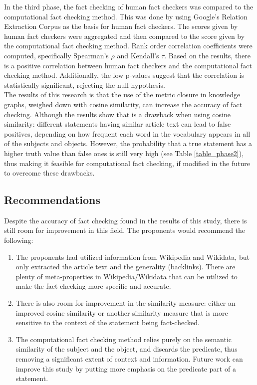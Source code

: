 \documentclass[10pt,11pt,12pt,oneside]{book}
\begin{document}
In the third phase, the fact checking of human fact checkers was compared to the computational fact checking method. This was done by using Google's Relation Extraction Corpus as the basis for human fact checkers. The scores given by human fact checkers were aggregated and then compared to the score given by the computational fact checking method. Rank order correlation coefficients were computed, specifically Spearman's $ \rho $ and Kendall's $ \tau $. Based on the results, there is a positive correlation between human fact checkers and the computational fact checking method. Additionally, the low p-values suggest that the correlation is statistically significant, rejecting the null hypothesis.\\

The results of this research is that the use of the metric closure in knowledge graphs, weighed down with cosine similarity, can increase the accuracy of fact checking. Although the results show that is a drawback when using cosine similarity: different statements having similar article text can lead to false positives, depending on how frequent each word in the vocabulary appears in all of the subjects and objects. However, the probability that a true statement has a higher truth value than false ones is still very high (see Table \ref{table_phase2}), thus making it feasible for computational fact checking, if modified in the future to overcome these drawbacks.


\subsection{Recommendations}

Despite the accuracy of fact checking found in the results of this study, there is still room for improvement in this field. The proponents would recommend the following:

\begin{enumerate}
	\item The proponents had utilized information from Wikipedia and Wikidata, but only extracted the article text and the generality (backlinks). There are plenty of meta-properties in Wikipedia/Wikidata that can be utilized to make the fact checking more specific and accurate.
	\item There is also room for improvement in the similarity measure: either an improved cosine similarity or another similarity measure that is more sensitive to the context of the statement being fact-checked.
	\item The computational fact checking method relies purely on the semantic similarity of the subject and the object, and discards the predicate, thus removing a significant extent of context and information. Future work can improve this study by putting more emphasis on the predicate part of a statement.
\end{enumerate}
\end{document}
